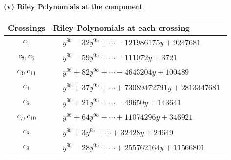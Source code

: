 \documentclass[1p]{elsarticle_modified}
\theoremstyle{definition}
\begin{document}
\newpage\renewcommand{\arraystretch}{1}
\flushleft \textbf{(v) Riley Polynomials at the component}\newline \\
\begin{tabular}{m{50pt}|m{274pt}}
Crossings & \hspace{64pt}Riley Polynomials at each crossing \\
\hline $$\begin{aligned}c_{1}\end{aligned}$$&$\begin{aligned}
&y^{96}-32 y^{95}+\cdots-121986175 y+9247681
\end{aligned}$\\
\hline $$\begin{aligned}c_{2},c_{5}\end{aligned}$$&$\begin{aligned}
&y^{96}-59 y^{95}+\cdots-111072 y+3721
\end{aligned}$\\
\hline $$\begin{aligned}c_{3},c_{11}\end{aligned}$$&$\begin{aligned}
&y^{96}+82 y^{95}+\cdots-4643204 y+100489
\end{aligned}$\\
\hline $$\begin{aligned}c_{4}\end{aligned}$$&$\begin{aligned}
&y^{96}+37 y^{95}+\cdots+73089472791 y+2813347681
\end{aligned}$\\
\hline $$\begin{aligned}c_{6}\end{aligned}$$&$\begin{aligned}
&y^{96}+21 y^{95}+\cdots-49650 y+143641
\end{aligned}$\\
\hline $$\begin{aligned}c_{7},c_{10}\end{aligned}$$&$\begin{aligned}
&y^{96}+64 y^{95}+\cdots+11074296 y+346921
\end{aligned}$\\
\hline $$\begin{aligned}c_{8}\end{aligned}$$&$\begin{aligned}
&y^{96}+3 y^{95}+\cdots+32428 y+24649
\end{aligned}$\\
\hline $$\begin{aligned}c_{9}\end{aligned}$$&$\begin{aligned}
&y^{96}-28 y^{95}+\cdots+255762164 y+11566801
\end{aligned}$\\
\hline
\end{tabular}\\~\\
\end{document}
